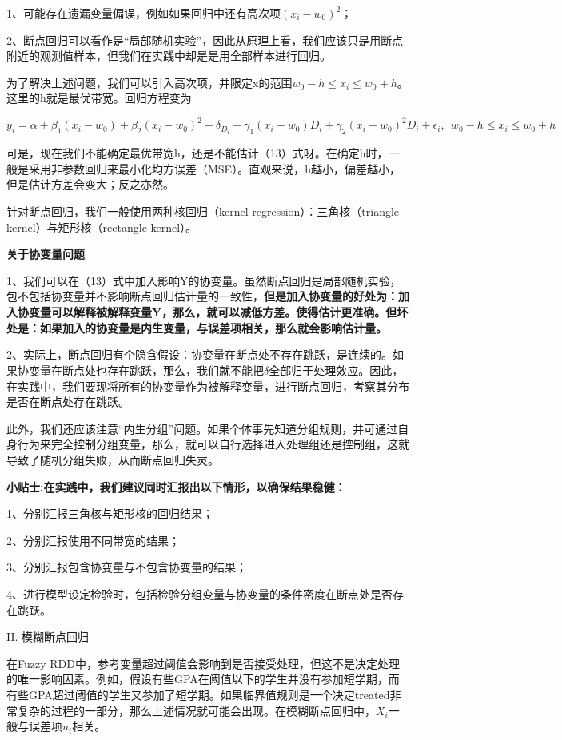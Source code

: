 \documentclass[cn,10pt,math=newtx,citestyle=gb7714-2015,bibstyle=gb7714-2015]{elegantbook}
\begin{document}
	1、可能存在遗漏变量偏误，例如如果回归中还有高次项$(x_i-w_0)^2$；
	
	2、断点回归可以看作是“局部随机实验”，因此从原理上看，我们应该只是用断点附近的观测值样本，但我们在实践中却是是用全部样本进行回归。
	
	为了解决上述问题，我们可以引入高次项，并限定x的范围$w_0-h\le{x_i}\le{w_0+h}$。这里的h就是最优带宽。回归方程变为
	
	\begin{equation}
		y_i=\alpha+\beta_1(x_i-w_0)+\beta_2(x_i-w_0)^2+\delta_{D_i}+\gamma_1(x_i-w_0)D_i+\gamma_2(x_i-w_0)^2D_i+\epsilon_i,~~w_0-h\le{x_i}\le{w_0+h}
	\end{equation}
	
	可是，现在我们不能确定最优带宽h，还是不能估计（13）式呀。在确定h时，一般是采用非参数回归来最小化均方误差（MSE）。直观来说，h越小，偏差越小，但是估计方差会变大；反之亦然。
	
	针对断点回归，我们一般使用两种核回归（kernel regression）：三角核（triangle kernel）与矩形核（rectangle kernel）。
	
	\textbf{关于协变量问题}
	
	1、我们可以在（13）式中加入影响Y的协变量。虽然断点回归是局部随机实验，包不包括协变量并不影响断点回归估计量的一致性，\textbf{但是加入协变量的好处为：加入协变量可以解释被解释变量Y，那么，就可以减低方差。使得估计更准确。但坏处是：如果加入的协变量是内生变量，与误差项相关，那么就会影响估计量。}
	
	2、实际上，断点回归有个隐含假设：协变量在断点处不存在跳跃，是连续的。如果协变量在断点处也存在跳跃，那么，我们就不能把$\tilde{\delta}$全部归于处理效应。因此，在实践中，我们要现将所有的协变量作为被解释变量，进行断点回归，考察其分布是否在断点处存在跳跃。
	
	此外，我们还应该注意“内生分组”问题。如果个体事先知道分组规则，并可通过自身行为来完全控制分组变量，那么，就可以自行选择进入处理组还是控制组，这就导致了随机分组失败，从而断点回归失灵。
	
	\textbf{小贴士:在实践中，我们建议同时汇报出以下情形，以确保结果稳健：}
	
	1、分别汇报三角核与矩形核的回归结果；
	
	2、分别汇报使用不同带宽的结果；
	
	3、分别汇报包含协变量与不包含协变量的结果；
	
	4、进行模型设定检验时，包括检验分组变量与协变量的条件密度在断点处是否存在跳跃。
	
	
	II. 模糊断点回归
	
	在Fuzzy RDD中，参考变量超过阈值会影响到是否接受处理，但这不是决定处理的唯一影响因素。例如，假设有些GPA在阈值以下的学生并没有参加短学期，而有些GPA超过阈值的学生又参加了短学期。如果临界值规则是一个决定treated非常复杂的过程的一部分，那么上述情况就可能会出现。在模糊断点回归中，$X_i$一般与误差项$u_i$相关。
	
\end{document}
